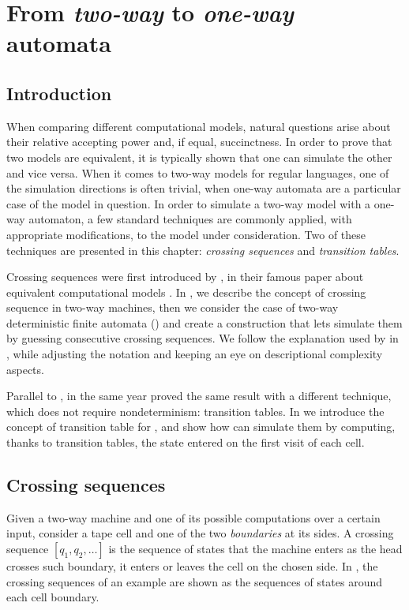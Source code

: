 \chapter{From \emph{two-way} to \emph{one-way} automata}



\section{Introduction}
When comparing different computational models, natural questions arise about their relative accepting power and, if equal, succinctness.
In order to prove that two models are equivalent, it is typically shown that one can simulate the other and vice versa.
When it comes to two-way models for regular languages, one of the simulation directions is often trivial, when one-way automata are a particular case of the model in question.
In order to simulate a two-way model with a one-way automaton, a few standard techniques are commonly applied, with appropriate modifications, to the model under consideration.
Two of these techniques are presented in this chapter: \emph{crossing sequences} and \emph{transition tables}.

Crossing sequences were first introduced by \citeauthor{RabSco59}, in their famous \citeyear{RabSco59} paper about equivalent computational models \cite{RabSco59}.
In , we describe the concept of crossing sequence in two-way machines, then we consider the case of two-way deterministic finite automata (\TDFA) and create a construction that lets \ONFAs simulate them by guessing consecutive crossing sequences.
We follow the explanation used by \citeauthor{HopUll79} in \cite{HopUll79}, while adjusting the notation and keeping an eye on descriptional complexity aspects.

Parallel to \citeauthor{RabSco59}, in the same year \citeauthor{She59} proved the same result with a different technique, which does not require nondeterminism: transition tables.
In  we introduce the concept of transition table for \TDFAs, and show how \DFAs can simulate them by computing, thanks to transition tables, the state entered on the first visit of each cell.


\section{Crossing sequences}\label{sec:crossseq2DFA}
Given a two-way machine and one of its possible computations over a certain input, consider a tape cell and one of the two \emph{boundaries} at its sides.
A crossing sequence $[q_1,q_2,\dots]$ is the sequence of states that the machine enters as the head crosses such boundary, \ie it enters or leaves the cell on the chosen side.
In , the crossing sequences of an example \TDFA are shown as the sequences of states around each cell boundary.

